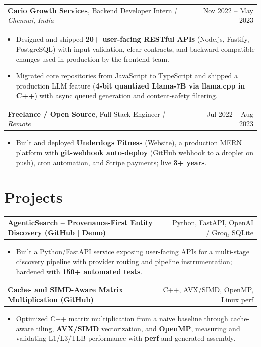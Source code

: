 \documentclass[letterpaper,11pt]{article}
\makeatletter
\newcommand{\expItem}[4]{%
  \vspace{3pt}
  \begin{tabular*}{\textwidth}{@{}l@{\extracolsep{\fill}}r@{}}
    \textbf{#1}, #2 \textit{| #3} & #4 \\
  \end{tabular*}\par\vspace{-2pt}
}
\newcommand{\projItem}[2]{%
  \vspace{6pt}
  \begin{tabular*}{\textwidth}{@{}l@{\extracolsep{\fill}}r@{}}
    \textbf{#1} & #2 \\
  \end{tabular*}\par\vspace{-2pt}
}
\makeatother
\begin{document}
\expItem{Cario Growth Services}{Backend Developer Intern}{Chennai, India}{Nov 2022 -- May 2023}
\begin{itemize}
  \item Designed and shipped \textbf{20+ user-facing RESTful APIs} (Node.js, Fastify, PostgreSQL) with input validation, clear contracts, and backward-compatible changes used in production by the frontend team.
  \item Migrated core repositories from JavaScript to TypeScript and shipped a production LLM feature (\textbf{4-bit quantized Llama-7B via llama.cpp in C++}) with async queued generation and content-safety filtering.
\end{itemize}

\expItem{Freelance / Open Source}{Full-Stack Engineer}{Remote}{Jul 2022 -- Aug 2023}
\begin{itemize}
  \item Built and deployed \textbf{Underdogs Fitness} (\href{https://www.underdogsfitness.in/}{Website}), a production MERN platform with \textbf{git-webhook auto-deploy} (GitHub webhook to a droplet on push), cron automation, and Stripe payments; live \textbf{3+ years}.
\end{itemize}

\section{Projects}

\projItem{AgenticSearch -- Provenance-First Entity Discovery {\normalfont\small(\href{https://github.com/Deva-1903/ciir_agentic_search}{GitHub} $\vert$ \href{https://agentic-search-negglszkwa-uc.a.run.app}{Demo})}}{Python, FastAPI, OpenAI / Groq, SQLite}
\begin{itemize}
  \item Built a Python/FastAPI service exposing user-facing APIs for a multi-stage discovery pipeline with provider routing and pipeline instrumentation; hardened with \textbf{150+ automated tests}.
\end{itemize}

\projItem{Cache- and SIMD-Aware Matrix Multiplication {\normalfont\small(\href{https://github.com/Deva-1903/cs690pf}{GitHub})}}{C++, AVX/SIMD, OpenMP, Linux perf}
\begin{itemize}
  \item Optimized C++ matrix multiplication from a naive baseline through cache-aware tiling, \textbf{AVX/SIMD} vectorization, and \textbf{OpenMP}, measuring and validating L1/L3/TLB performance with \textbf{perf} and generated assembly.
\end{itemize}
\end{document}

